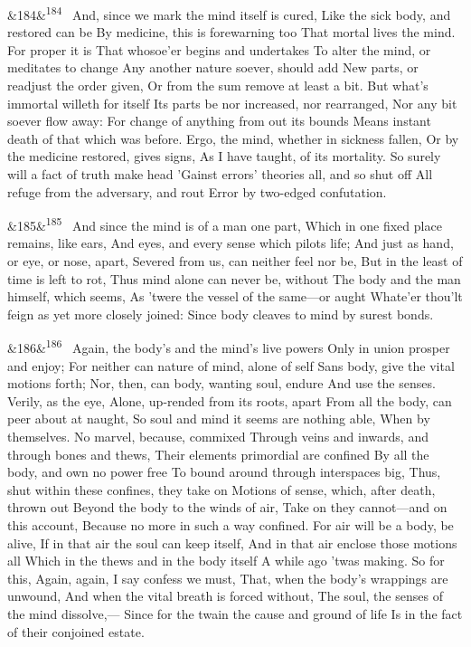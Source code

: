 \documentclass[12pt]{article}
\newcommand{\para}[1][]{\par\noindent\ifx&#1&\else\textsuperscript{\footnotesize #1}~\fi}
\begin{document}
\para[184] And, since we mark the mind itself is cured, Like the sick body, and restored can be By medicine, this is forewarning too That mortal lives the mind. For proper it is That whosoe'er begins and undertakes To alter the mind, or meditates to change Any another nature soever, should add New parts, or readjust the order given, Or from the sum remove at least a bit. But what's immortal willeth for itself Its parts be nor increased, nor rearranged, Nor any bit soever flow away: For change of anything from out its bounds Means instant death of that which was before. Ergo, the mind, whether in sickness fallen, Or by the medicine restored, gives signs, As I have taught, of its mortality. So surely will a fact of truth make head 'Gainst errors' theories all, and so shut off All refuge from the adversary, and rout Error by two-edged confutation.

\para[185] And since the mind is of a man one part, Which in one fixed place remains, like ears, And eyes, and every sense which pilots life; And just as hand, or eye, or nose, apart, Severed from us, can neither feel nor be, But in the least of time is left to rot, Thus mind alone can never be, without The body and the man himself, which seems, As 'twere the vessel of the same---or aught Whate'er thou'lt feign as yet more closely joined: Since body cleaves to mind by surest bonds.

\para[186] Again, the body's and the mind's live powers Only in union prosper and enjoy; For neither can nature of mind, alone of self Sans body, give the vital motions forth; Nor, then, can body, wanting soul, endure And use the senses. Verily, as the eye, Alone, up-rended from its roots, apart From all the body, can peer about at naught, So soul and mind it seems are nothing able, When by themselves. No marvel, because, commixed Through veins and inwards, and through bones and thews, Their elements primordial are confined By all the body, and own no power free To bound around through interspaces big, Thus, shut within these confines, they take on Motions of sense, which, after death, thrown out Beyond the body to the winds of air, Take on they cannot---and on this account, Because no more in such a way confined. For air will be a body, be alive, If in that air the soul can keep itself, And in that air enclose those motions all Which in the thews and in the body itself A while ago 'twas making. So for this, Again, again, I say confess we must, That, when the body's wrappings are unwound, And when the vital breath is forced without, The soul, the senses of the mind dissolve,--- Since for the twain the cause and ground of life Is in the fact of their conjoined estate.
\end{document}
